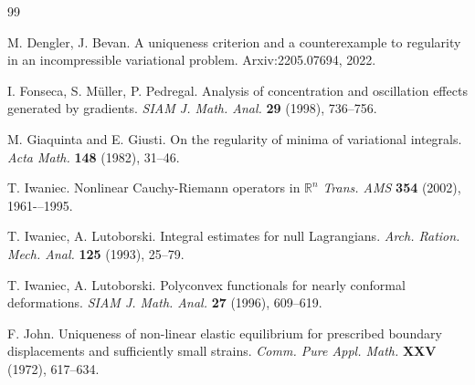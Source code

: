 \documentclass[12pt]{amsart}
\newcommand{\R}{\mathbb{R}}
\newcommand{\1}{{\bf 1}}
\newcommand{\referee}{\color{black}}
\begin{document}
\begin{thebibliography}{99}

 M. Dengler, J. Bevan. A uniqueness criterion and a counterexample to regularity in an incompressible variational problem. Arxiv:2205.07694, 2022. 





I. Fonseca, S. M\"{u}ller, P. Pedregal. Analysis of concentration and oscillation effects generated by gradients. {\it SIAM J. Math. Anal.} {\bf 29} (1998), 736--756.

\referee

 M. Giaquinta and E. Giusti.  On the regularity of minima of variational integrals. {\it Acta Math.} {\bf 148} (1982), 31--46.

T. Iwaniec. Nonlinear Cauchy-Riemann operators in $\R^n$
{\it Trans. AMS} {\bf 354} (2002),   1961-–1995.

 T. Iwaniec, A. Lutoborski. Integral estimates for null Lagrangians. {\it Arch. Ration. Mech. Anal.} {\bf  125} (1993), 25--79.

 T. Iwaniec, A. Lutoborski. Polyconvex functionals for nearly conformal deformations. {\it SIAM J. Math. Anal.}
 {\bf 27} (1996), 609--619.

 
 F. John. Uniqueness of non-linear elastic equilibrium for prescribed boundary displacements and sufficiently small strains. {\it Comm. Pure Appl. Math.} {\bf XXV} (1972), 617--634. 





\end{thebibliography}
\end{document}
